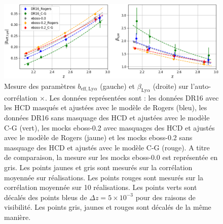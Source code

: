 \documentclass[11pt, twoside, a4paper, openright]{report}
\begin{document}
\begin{figure}
  \centering
  \includegraphics[scale=0.45]{bias_CG_no_mask}
  \caption{Mesure des paramètres $b_{\mathrm{eff},\mathrm{Ly}\alpha}$ (gauche) et  $\beta_{\mathrm{Ly}\alpha}$ (droite) sur l'auto-corrélation \lya$\times$\lya{}.
    Les données représentées sont : les données DR16 avec les HCD masqués et ajustées avec le modèle de Rogers (bleu), les données DR16 sans masquage des HCD et ajustées avec le modèle C-G (vert), les mocks eboss-0.2 avec masquages des HCD et ajustés avec le modèle de Rogers (jaune) et les mocks eboss-0.2 sans masquage des HCD et ajustés avec le modèle C-G (rouge). A titre de comparaison, la mesure sur les mocks eboss-0.0 est représentée en gris.
    Les points jaunes et gris sont mesurés sur la corrélation moyennée sur \Nmocks{} réalisations. Les points rouges sont mesurés sur la corrélation moyennée sur \num{10} réalisations.
    Les points verts sont décalés des points bleus de $\Delta z = 5\times10^{-3}$ pour des raisons de visibilité. Les points gris, jaunes et rouges sont décalés de la même manière.
  }
  \label{fig:bias_CG_no_mask}
\end{figure}
\end{document}
